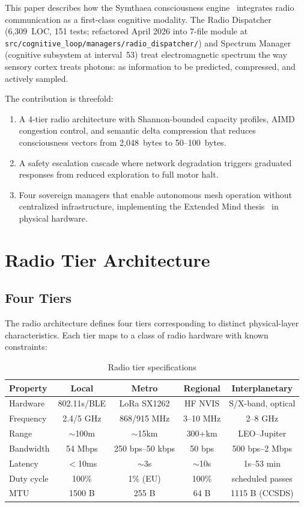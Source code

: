 \documentclass[11pt,twocolumn]{article}
\begin{document}
This paper describes how the Symthaea consciousness engine~\cite{symthaea2026}
integrates radio communication as a first-class cognitive modality. The Radio
Dispatcher (6,309~LOC, 151 tests; refactored April 2026 into 7-file module at \texttt{src/cognitive\_loop/managers/radio\_dispatcher/}) and Spectrum Manager (cognitive
subsystem at interval~53) treat electromagnetic spectrum the way sensory cortex
treats photons: as information to be predicted, compressed, and actively sampled.

The contribution is threefold:
\begin{enumerate}[nosep]
  \item A 4-tier radio architecture with Shannon-bounded capacity profiles,
    AIMD congestion control, and semantic delta compression that reduces
    consciousness vectors from 2,048~bytes to 50--100~bytes.
  \item A safety escalation cascade where network degradation triggers
    graduated responses from reduced exploration to full motor halt.
  \item Four sovereign managers that enable autonomous mesh operation
    without centralized infrastructure, implementing the Extended Mind
    thesis~\cite{clark1998} in physical hardware.
\end{enumerate}

\section{Radio Tier Architecture}

\subsection{Four Tiers}

The radio architecture defines four tiers corresponding to distinct
physical-layer characteristics. Each tier maps to a class of radio hardware
with known constraints:

\begin{table}[H]
\centering
\caption{Radio tier specifications}
\label{tab:tiers}
\scriptsize
\begin{tabular}{@{}lcccc@{}}
\toprule
\textbf{Property} & \textbf{Local} & \textbf{Metro} & \textbf{Regional} & \textbf{Interplanetary} \\
\midrule
Hardware & 802.11s/BLE & LoRa SX1262 & HF NVIS & S/X-band, optical \\
Frequency & 2.4/5 GHz & 868/915 MHz & 3--10 MHz & 2--8 GHz \\
Range & $\sim$100m & $\sim$15km & 300+km & LEO--Jupiter \\
Bandwidth & 54 Mbps & 250 bps--50 kbps & 50 bps & 500 bps--2 Mbps \\
Latency & $<$10ms & $\sim$3s & $\sim$10s & 1s--53 min \\
Duty cycle & 100\% & 1\% (EU) & 100\% & scheduled passes \\
MTU & 1500 B & 255 B & 64 B & 1115 B (CCSDS) \\
\bottomrule
\end{tabular}
\end{table}
\end{document}
